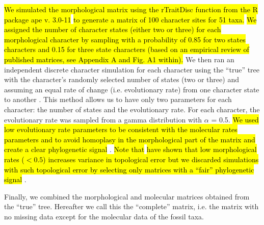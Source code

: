 \documentclass[12pt,letterpaper]{article}
\begin{document}
\hl{We simulated the morphological matrix using the rTraitDisc function from the R package ape v. 3.0-11} \citep{paradisape:2004}\hl{ to generate a matrix of 100 character sites for 51 taxa.}
\hl{We assigned the number of character states (either two or three) for each morphological character by sampling with a probability of 0.85 for two states characters and 0.15 for three state characters (based on an empirical review of published matrices, see Appendix A and Fig. A1 within).}
We then ran an independent discrete character simulation for each character using the ``true'' tree with the character's randomly selected number of states (two or three) and assuming an equal rate of change (i.e. evolutionary rate) from one character state to another \citep{Pagel22011994}.
This method allows us to have only two parameters for each character: the number of states and the evolutionary rate.
For each character, the evolutionary rate was sampled from a gamma distribution with $\alpha$ = 0.5.
\hl{We used low evolutionary rate parameters to be consistent with the molecular rates parameters and to avoid homoplasy in the morphological part of the matrix and create a clear phylogenetic signal} \citep{wrightbayesian2014}.
\hl{Note that} \cite{wrightbayesian2014} \hl{have shown that low morphological rates ($<0.5$) increases variance in topological error but we discarded simulations with such topological error by selecting only matrices with a ``fair'' phylogenetic signal} \citep[\hl{see Estimating phylogenies section below;}][]{zanderminimal2004}.

Finally, we combined the morphological and molecular matrices obtained from the ``true'' tree.
Hereafter we call this the ``complete'' matrix, i.e. the matrix with no missing data except for the molecular data of the fossil taxa.
\end{document}
